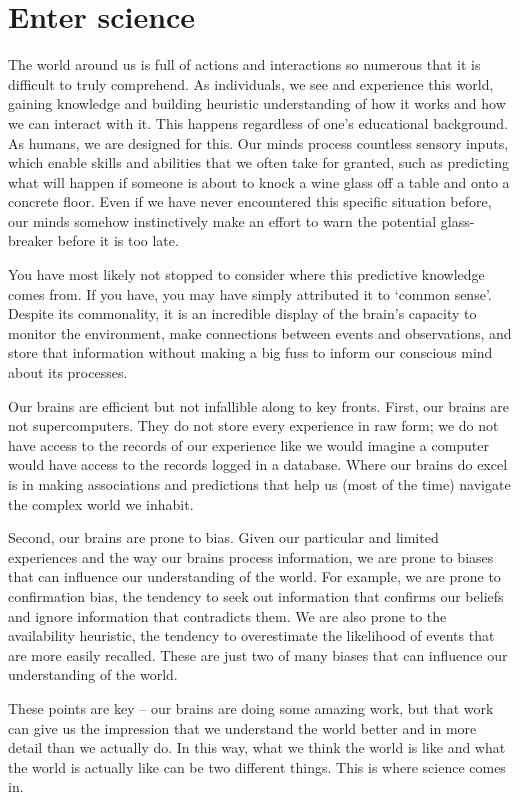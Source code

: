 \documentclass[
  letterpaper,
]{latex/krantz}
\theoremstyle{definition}
\theoremstyle{remark}
\begin{document}
\section{Enter science}\label{sec-enter-science}

The world around us is full of actions and interactions so numerous that
it is difficult to truly comprehend. As individuals, we see and
experience this world, gaining knowledge and building heuristic
understanding of how it works and how we can interact with it. This
happens regardless of one's educational background. As humans, we are
designed for this. Our minds process countless sensory inputs, which
enable skills and abilities that we often take for granted, such as
predicting what will happen if someone is about to knock a wine glass
off a table and onto a concrete floor. Even if we have never encountered
this specific situation before, our minds somehow instinctively make an
effort to warn the potential glass-breaker before it is too late.

You have most likely not stopped to consider where this predictive
knowledge comes from. If you have, you may have simply attributed it to
`common sense'. Despite its commonality, it is an incredible display of
the brain's capacity to monitor the environment, make connections
between events and observations, and store that information without
making a big fuss to inform our conscious mind about its processes.

Our brains are efficient but not infallible along to key fronts. First,
our brains are not supercomputers. They do not store every experience in
raw form; we do not have access to the records of our experience like we
would imagine a computer would have access to the records logged in a
database. Where our brains do excel is in making associations and
predictions that help us (most of the time) navigate the complex world
we inhabit.

Second, our brains are prone to bias. Given our particular and limited
experiences and the way our brains process information, we are prone to
biases that can influence our understanding of the world. For example,
we are prone to confirmation bias, the tendency to seek out information
that confirms our beliefs and ignore information that contradicts them.
We are also prone to the availability heuristic, the tendency to
overestimate the likelihood of events that are more easily recalled.
These are just two of many biases that can influence our understanding
of the world.

These points are key -- our brains are doing some amazing work, but that
work can give us the impression that we understand the world better and
in more detail than we actually do. In this way, what we think the world
is like and what the world is actually like can be two different things.
This is where science comes in.
\end{document}
